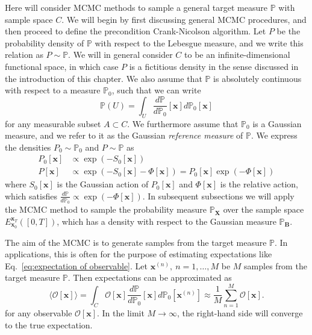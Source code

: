 Here will consider MCMC methods to sample a general target measure $\mathbb{P}$ with sample space $C$. We will begin by first discussing general MCMC procedures, and then proceed to define the precondition Crank-Nicolson algorithm. Let $P$ be the probability density of $\mathbb{P}$ with respect to the Lebesgue measure, and we write this relation as $P \sim \mathbb{P}$. We will in general consider $C$ to be an infinite-dimensional functional space, in which case $P$ is a fictitious density in the sense discussed in the introduction of this chapter. We also assume that $\mathbb{P}$ is absolutely continuous with respect to a measure $\mathbb{P}_0$, such that we can write
\begin{equation} 
	\mathbb{P}(U) = \int_U \frac{d \mathbb{P}}{d \mathbb{P}_0}[\mathbf{x}] d \mathbb{P}_0[\mathbf{x}]
\end{equation}
for any measurable subset $A \subset C$. We furthermore assume that $\mathbb{P}_0$ is a Gaussian measure, and we refer to it as the Gaussian \textit{reference measure} of $\mathbb{P}$. We express the densities $P_0 \sim \mathbb{P}_0$ and $P \sim \mathbb{P}$ as
\begin{subequations}
\begin{align}
	P_0[\mathbf{x}] & \propto \exp ( -S_0[\mathbf{x}] ) \\
	P[\mathbf{x}] & \propto \exp (  -S_0[\mathbf{x}] - \Phi[\mathbf{x}] ) = P_0[\mathbf{x}] \exp ( - \Phi[\mathbf{x}] )
\end{align}
\end{subequations}
where $S_0[\mathbf{x}]$ is the Gaussian action of $P_0[\mathbf{x}]$ and $\Phi[\mathbf{x}]$ is the relative action, which satisfies $\frac{d \mathbb{P}}{d \mathbb{P}_0} \propto \exp( - \Phi[\mathbf{x}] )$. In subsequent subsections we will apply the MCMC method to sample the probability measure $\mathbb{P}_\mathbf{X}$ over the sample space $E_{\mathbf{x}_0}^{\mathbf{x}_T}([0,T])$, which has a density with respect to the Gaussian measure $\mathbb{P}_\mathbf{B}$.

The aim of the MCMC is to generate samples from the target measure $\mathbb{P}$. In applications, this is often for the purpose of estimating expectations like Eq.~\ref{eq:expectation of observable}. Let $\mathbf{x}^{(n)},\ n=1,\dots,M$ be $M$ samples from the target measure $\mathbb{P}$. Then expectations can be approximated as
\begin{equation} \label{eq:MCMC expectation}
	\langle \mathcal{O}[\mathbf{x}] \rangle = \int_C \mathcal{O}[\mathbf{x}] \frac{d \mathbb{P}}{d \mathbb{P}_0}[\mathbf{x}] d \mathbb{P}_0[\mathbf{x}^{(n)}] \approx \frac{1}{M} \sum_{n=1}^{M} \mathcal{O}[\mathbf{x}].
\end{equation}
for any observable $\mathcal{O}[\mathbf{x}]$. In the limit $M \to \infty$, the right-hand side will converge to the true expectation.

